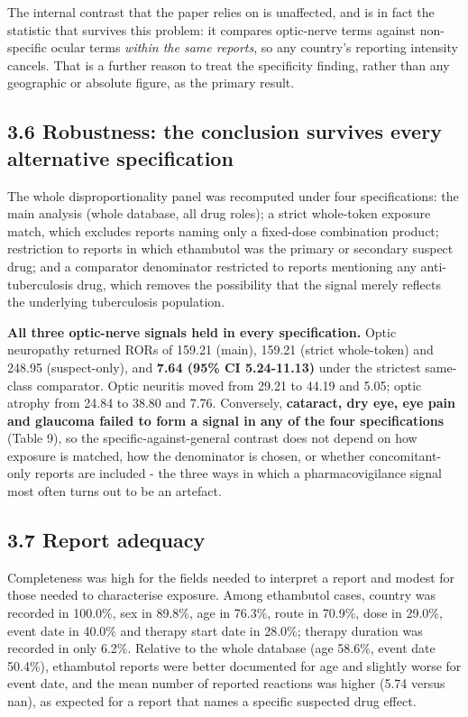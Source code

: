 \documentclass[utf8]{FrontiersinVancouver}
\begin{document}
The internal contrast that the paper relies on is unaffected, and is in fact the statistic that survives this problem: it compares optic-nerve terms against non-specific ocular terms \textit{within the same reports}, so any country's reporting intensity cancels. That is a further reason to treat the specificity finding, rather than any geographic or absolute figure, as the primary result.

\subsection{3.6 Robustness: the conclusion survives every alternative specification}

The whole disproportionality panel was recomputed under four specifications: the main analysis (whole database, all drug roles); a strict whole-token exposure match, which excludes reports naming only a fixed-dose combination product; restriction to reports in which ethambutol was the primary or secondary suspect drug; and a comparator denominator restricted to reports mentioning any anti-tuberculosis drug, which removes the possibility that the signal merely reflects the underlying tuberculosis population.

\textbf{All three optic-nerve signals held in every specification.} Optic neuropathy returned RORs of 159.21 (main), 159.21 (strict whole-token) and 248.95 (suspect-only), and \textbf{7.64 (95\% CI 5.24-11.13)} under the strictest same-class comparator. Optic neuritis moved from 29.21 to 44.19 and 5.05; optic atrophy from 24.84 to 38.80 and 7.76. Conversely, \textbf{cataract, dry eye, eye pain and glaucoma failed to form a signal in any of the four specifications} (Table 9), so the specific-against-general contrast does not depend on how exposure is matched, how the denominator is chosen, or whether concomitant-only reports are included - the three ways in which a pharmacovigilance signal most often turns out to be an artefact.

\subsection{3.7 Report adequacy}

Completeness was high for the fields needed to interpret a report and modest for those needed to characterise exposure. Among ethambutol cases, country was recorded in 100.0\%, sex in 89.8\%, age in 76.3\%, route in 70.9\%, dose in 29.0\%, event date in 40.0\% and therapy start date in 28.0\%; therapy duration was recorded in only 6.2\%. Relative to the whole database (age 58.6\%, event date 50.4\%), ethambutol reports were better documented for age and slightly worse for event date, and the mean number of reported reactions was higher (5.74 versus nan), as expected for a report that names a specific suspected drug effect.
\end{document}
